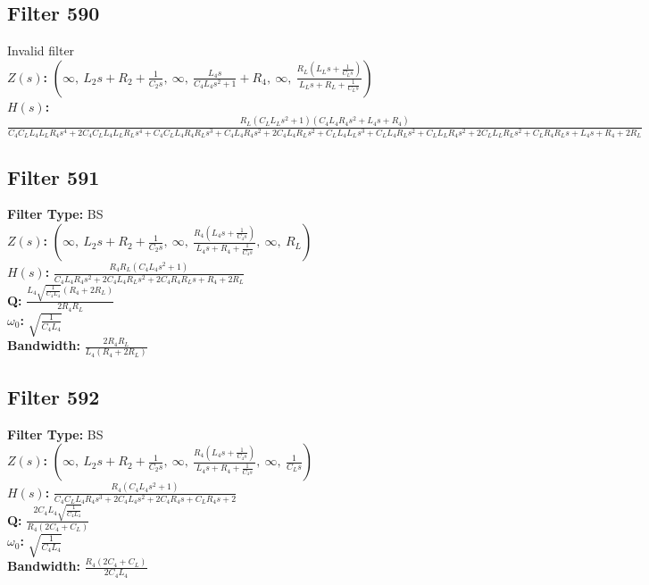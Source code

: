 \documentclass{article}
\begin{document}
\subsection*{Filter 590}
Invalid filter \\ 
\textbf{$Z(s)$:} $\left( \infty, \  L_{2} s + R_{2} + \frac{1}{C_{2} s}, \  \infty, \  \frac{L_{4} s}{C_{4} L_{4} s^{2} + 1} + R_{4}, \  \infty, \  \frac{R_{L} \left(L_{L} s + \frac{1}{C_{L} s}\right)}{L_{L} s + R_{L} + \frac{1}{C_{L} s}}\right)$ \\ 
\textbf{$H(s)$:} $\frac{R_{L} \left(C_{L} L_{L} s^{2} + 1\right) \left(C_{4} L_{4} R_{4} s^{2} + L_{4} s + R_{4}\right)}{C_{4} C_{L} L_{4} L_{L} R_{4} s^{4} + 2 C_{4} C_{L} L_{4} L_{L} R_{L} s^{4} + C_{4} C_{L} L_{4} R_{4} R_{L} s^{3} + C_{4} L_{4} R_{4} s^{2} + 2 C_{4} L_{4} R_{L} s^{2} + C_{L} L_{4} L_{L} s^{3} + C_{L} L_{4} R_{L} s^{2} + C_{L} L_{L} R_{4} s^{2} + 2 C_{L} L_{L} R_{L} s^{2} + C_{L} R_{4} R_{L} s + L_{4} s + R_{4} + 2 R_{L}}$ \\ 
\subsection*{Filter 591}
\textbf{Filter Type:} BS \\ 
\textbf{$Z(s)$:} $\left( \infty, \  L_{2} s + R_{2} + \frac{1}{C_{2} s}, \  \infty, \  \frac{R_{4} \left(L_{4} s + \frac{1}{C_{4} s}\right)}{L_{4} s + R_{4} + \frac{1}{C_{4} s}}, \  \infty, \  R_{L}\right)$ \\ 
\textbf{$H(s)$:} $\frac{R_{4} R_{L} \left(C_{4} L_{4} s^{2} + 1\right)}{C_{4} L_{4} R_{4} s^{2} + 2 C_{4} L_{4} R_{L} s^{2} + 2 C_{4} R_{4} R_{L} s + R_{4} + 2 R_{L}}$ \\ 
\textbf{Q:} $\frac{L_{4} \sqrt{\frac{1}{C_{4} L_{4}}} \left(R_{4} + 2 R_{L}\right)}{2 R_{4} R_{L}}$ \\ 
\textbf{$\omega_0$:} $\sqrt{\frac{1}{C_{4} L_{4}}}$ \\ 
\textbf{Bandwidth:} $\frac{2 R_{4} R_{L}}{L_{4} \left(R_{4} + 2 R_{L}\right)}$ \\ 
\subsection*{Filter 592}
\textbf{Filter Type:} BS \\ 
\textbf{$Z(s)$:} $\left( \infty, \  L_{2} s + R_{2} + \frac{1}{C_{2} s}, \  \infty, \  \frac{R_{4} \left(L_{4} s + \frac{1}{C_{4} s}\right)}{L_{4} s + R_{4} + \frac{1}{C_{4} s}}, \  \infty, \  \frac{1}{C_{L} s}\right)$ \\ 
\textbf{$H(s)$:} $\frac{R_{4} \left(C_{4} L_{4} s^{2} + 1\right)}{C_{4} C_{L} L_{4} R_{4} s^{3} + 2 C_{4} L_{4} s^{2} + 2 C_{4} R_{4} s + C_{L} R_{4} s + 2}$ \\ 
\textbf{Q:} $\frac{2 C_{4} L_{4} \sqrt{\frac{1}{C_{4} L_{4}}}}{R_{4} \left(2 C_{4} + C_{L}\right)}$ \\ 
\textbf{$\omega_0$:} $\sqrt{\frac{1}{C_{4} L_{4}}}$ \\ 
\textbf{Bandwidth:} $\frac{R_{4} \left(2 C_{4} + C_{L}\right)}{2 C_{4} L_{4}}$ \\ 
\end{document}

